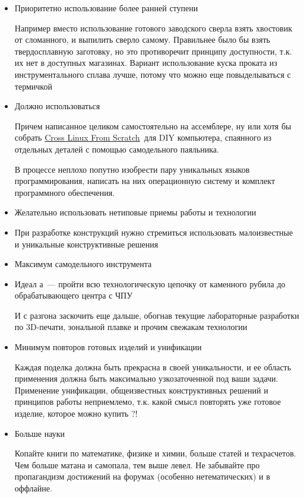 \begin{editorial}{1}
\begin{itemize}
\item Приоритетно использование более ранней ступени

Например вместо использование готового заводского сверла взять хвостовик от
сломанного, и выпилить сверло самому. Правильнее было бы взять твердосплавную
заготовку, но это противоречит принципу доступности, т.к. их нет в
доступных магазинах. Вариант использование куска проката из инструментального
сплава лучше, потому что можно еще повыделываться с термичкой \smiley

\item Должно использоваться 

Причем написанное целиком самостоятельно на ассемблере, ну или хотя бы собрать
\href{http://cross-lfs.org/}{Cross Linux From Scratch}\ для DIY компьютера,
спаянного из отдельных деталей с помощью самодельного паяльника.

В процессе неплохо попутно изобрести пару уникальных языков программирования,
написать на них операционную систему и комплект программного обеспечения.

\item Желательно использовать нетиповые приемы работы и технологии

\item При разработке конструкций нужно стремиться использовать малоизвестные и
уникальные конструктивные решения

\item Максимум самодельного инструмента

\item Идеал \scr а\ --- пройти всю технологическую цепочку от каменного 
рубила до обрабатывающего центра с ЧПУ

И с разгона заскочить еще дальше, обогнав текущие лабораторные разработки по
3D-печати, зональной плавке и прочим свежакам технологии

\item Минимум повторов готовых изделий и унификации

Каждая поделка должна быть прекрасна в своей уникальности, и ее область
применения должна быть максимально узкозаточенной под ваши задачи. Применение
унификации, общеизвестных конструктивных решений и принципов работы неприемлемо,
т.к. какой смысл повторять уже готовое изделие, которое можно купить ?!

\item Больше науки

Копайте книги по математике, физике и химии, больше статей и техрасчетов.
Чем больше матана и самопала, тем выше левел. Не забывайте про пропагандизм
достижений на форумах (особенно нетематических) и в оффлайне.


\end{itemize}
\end{editorial}
